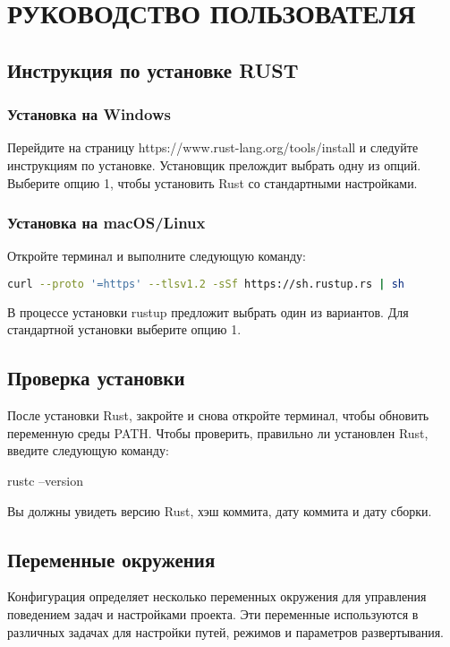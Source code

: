 \section{РУКОВОДСТВО ПОЛЬЗОВАТЕЛЯ}

\subsection{ Инструкция по установке RUST }
\subsubsection{ Установка на Windows }
    Перейдите на страницу https://www.rust-lang.org/tools/install и следуйте инструкциям по установке.
    Установщик прелождит выбрать одну из опций. Выберите опцию 1, чтобы установить Rust со стандартными настройками.

\subsubsection{Установка на macOS/Linux}
Откройте терминал и выполните следующую команду:

\begin{lstlisting}[language=bash]
curl --proto '=https' --tlsv1.2 -sSf https://sh.rustup.rs | sh
\end{lstlisting}


В процессе установки rustup предложит выбрать один из вариантов. Для стандартной установки выберите опцию 1.

\subsection{Проверка установки}
	После установки Rust, закройте и снова откройте терминал, чтобы обновить переменную среды PATH.
	Чтобы проверить, правильно ли установлен Rust, введите следующую команду:
\begin{lstinline}[language=bash]
rustc --version
\end{lstinline}


Вы должны увидеть версию Rust, хэш коммита, дату коммита и дату сборки.

\subsection{Переменные окружения}

Конфигурация определяет несколько переменных окружения для управления поведением задач и настройками проекта. Эти переменные используются в различных задачах для настройки путей, режимов и параметров развертывания.

